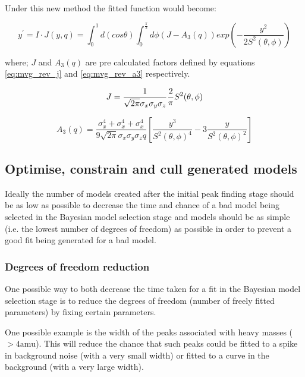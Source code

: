 \documentclass[a4paper]{article}
\begin{document}
Under this new method the fitted function would become:

\begin{equation}
  \label{eq:multivariate_gaussian_function_rev}
  y^{\prime} = I \cdot J(y, q) =
    \int_{0}^{1} d(cos \theta)
    \int_{0}^{\frac{\pi}{2}} d \phi
    \left(
    J - A_{3}(q)
    \right)
    exp\left(-\frac{y^{2}}{2 S^{2}(\theta, \phi)}\right)
\end{equation}

where; $J$ and $A_{3}(q)$ are pre calculated factors defined by equations
\ref{eq:mvg_rev_j} and \ref{eq:mvg_rev_a3} respectively.

\begin{equation}
  \label{eq:mvg_rev_j}
  J =
    \frac{1}{\sqrt{2 \pi} \sigma_{x} \sigma_{y} \sigma_{z}}
    \frac{2}{\pi}
    S^{2}(\theta, \phi) \\
\end{equation}

\begin{equation}
  \label{eq:mvg_rev_a3}
  A_{3}(q) =
    \frac{\sigma_{x}^{4} + \sigma_{x}^{4} + \sigma_{x}^{4}}
         {9 \sqrt{2 \pi} \sigma_{x} \sigma_{y} \sigma_{z} q}
    \left[
      \frac{y^{3}}{S^{2}(\theta, \phi)^{4}}
      -3 \frac{y}{S^{2}(\theta, \phi)^{2}}
    \right]
\end{equation}

\subsection{Optimise, constrain and cull generated models}

Ideally the number of models created after the initial peak finding stage should
be as low as possible to decrease the time and chance of a bad model being
selected in the Bayesian model selection stage and models should be as simple
(i.e. the lowest number of degrees of freedom) as possible in order to prevent
a good fit being generated for a bad model.

\subsubsection{Degrees of freedom reduction}

One possible way to both decrease the time taken for a fit in the Bayesian model
selection stage is to reduce the degrees of freedom (number of freely fitted
parameters) by fixing certain parameters.

One possible example is the width of the peaks associated with heavy masses ($>
4 \mathrm{amu}$). This will reduce the chance that such peaks could be fitted to
a spike in background noise (with a very small width) or fitted to a curve in
the background (with a very large width).
\end{document}
